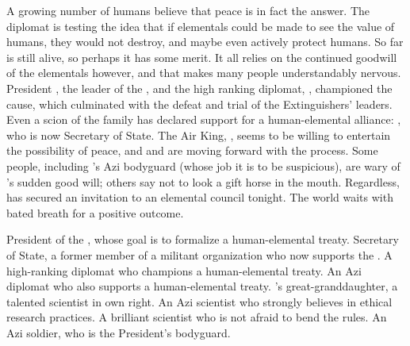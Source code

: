 \documentclass[blue]{elementals}
\begin{document}
A growing number of humans believe that peace is in fact the answer. The diplomat \cDiplomat{\full} is testing the idea that if elementals could be made to see the value of humans, they would not destroy, and maybe even actively protect humans.  So far \cDiplomat{} is still alive, so perhaps it has some merit. It all relies on the continued goodwill of the elementals however, and that makes many people understandably nervous. President \cLeader{\full}, the leader of the \cNewUN{\full}, and the high ranking diplomat, \cAvatar{\full}, championed the cause, which culminated with the defeat and trial of the Extinguishers' leaders. Even a scion of the \cDema{\formal} family has declared support for a human-elemental alliance: \cDema{}, who is now Secretary of State. The Air King, \cKing{}, seems to be willing to entertain the possibility of peace, and \cLeader{} and \cAvatar{} are moving forward with the process. Some people, including \cLeader{}'s Azi bodyguard \cRomeo{\full} (whose job it is to be suspicious), are wary of \cKing{}'s sudden good will; others say not to look a gift horse in the mouth. Regardless, \cLeader{} has secured an invitation to an elemental council tonight. The world waits with bated breath for a positive outcome.

\begin{members}
  \member{\cLeader{}} President of the \cNewUN{\full}, whose goal is to formalize a human-elemental treaty.
  \member{\cDema{}} Secretary of State, a former member of a militant organization who now supports the \cNewUN{\full}.
  \member{\cAvatar{}} A high-ranking diplomat who champions a human-elemental treaty.
  \member{\cDiplomat{}} An Azi diplomat who also supports a human-elemental treaty.
  \member{\cGD{}} \cGrandfather{\full}'s great-granddaughter, a talented scientist in \cGD{\their} own right. 
  \member{\cScientist{}} An Azi scientist who strongly believes in ethical research practices.
  \member{\cMS{}} A brilliant scientist who is not afraid to bend the rules.
  \member{\cRomeo{}} An Azi soldier, who is the President's bodyguard.
\end{members}
\end{document}
